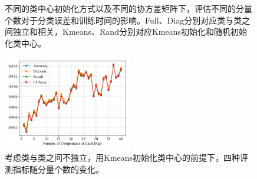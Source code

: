 \documentclass[UTF8]{ctexart}
\begin{document}
\begin{figure}[!h]
  \centering
  \quad  
  \caption{不同的类中心初始化方式以及不同的协方差矩阵下，评估不同的分量个数对于分类误差和训练时间的影响。Full、Diag分别对应类与类之间独立和相关，Kmeans、Rand分别对应Kmeans初始化和随机初始化类中心。}\label{fig:2-contrast}
\end{figure}

\begin{figure}[!h]
  \centering
  \includegraphics[width=0.5\textwidth]{figures/4metric.pdf}
  \caption{考虑类与类之间不独立，用Kmeans初始化类中心的前提下，四种评测指标随分量个数的变化。}\label{fig:2-4metrics}
\end{figure}
\end{document}
